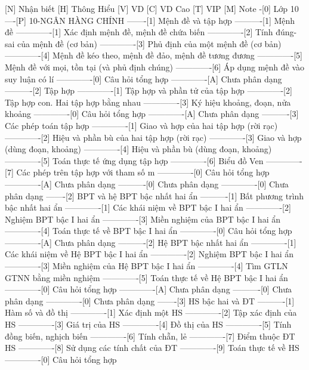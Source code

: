 [N] Nhận biết
[H] Thông Hiểu
[V] VD
[C] VD Cao
[T] VIP
[M] Note
%
%
-[0] Lớp 10
----[P] 10-NGÂN HÀNG CHÍNH
-------[1] Mệnh đề và tập hợp
----------[1] Mệnh đề
-------------[1] Xác định mệnh đề, mệnh đề chứa biến
-------------[2] Tính đúng-sai của mệnh đề (cơ bản)
-------------[3] Phủ định của một mệnh đề (cơ bản)
-------------[4] Mệnh đề kéo theo, mệnh đề đảo, mệnh đề tương đương
-------------[5] Mệnh đề với mọi, tồn tại (và phủ định chúng)
-------------[6] Áp dụng mệnh đề vào suy luận có lí
-------------[0] Câu hỏi tổng hợp
-------------[A] Chưa phân dạng
----------[2] Tập hợp
-------------[1] Tập hợp và phần tử của tập hợp
-------------[2] Tập hợp con. Hai tập hợp bằng nhau
-------------[3] Ký hiệu khoảng, đoạn, nửa khoảng
-------------[0] Câu hỏi tổng hợp
-------------[A] Chưa phân dạng
----------[3] Các phép toán tập hợp
-------------[1] Giao và hợp của hai tập hợp (rời rạc)
-------------[2] Hiệu và phần bù của hai tập hợp (rời rạc)
-------------[3] Giao và hợp (dùng đoạn, khoảng)
-------------[4] Hiệu và phần bù (dùng đoạn, khoảng)
-------------[5] Toán thực tế ứng dụng tập hợp
-------------[6] Biểu đồ Ven
-------------[7] Các phép trên tập hợp với tham số m
-------------[0] Câu hỏi tổng hợp
-------------[A] Chưa phân dạng
----------[0] Chưa phân dạng
-------------[0] Chưa phân dạng
-------[2] BPT và hệ BPT bậc nhất hai ẩn
----------[1] Bất phương trình bậc nhất hai ẩn
-------------[1] Các khái niệm về BPT bậc I hai ẩn
-------------[2] Nghiệm BPT bậc I hai ẩn
-------------[3] Miền nghiệm của BPT bậc I hai ẩn
-------------[4] Toán thực tế về BPT bậc I hai ẩn
-------------[0] Câu hỏi tổng hợp
-------------[A] Chưa phân dạng
----------[2] Hệ BPT bậc nhất hai ẩn
-------------[1] Các khái niệm về Hệ BPT bậc I hai ẩn
-------------[2] Nghiệm BPT bậc I hai ẩn
-------------[3] Miền nghiệm của Hệ BPT bậc I hai ẩn
-------------[4] Tìm GTLN GTNN bằng miền nghiệm
-------------[5] Toán thực tế về Hệ BPT bậc I hai ẩn
-------------[0] Câu hỏi tổng hợp
-------------[A] Chưa phân dạng
----------[0] Chưa phân dạng
-------------[0] Chưa phân dạng
-------[3] HS bậc hai và ĐT
----------[1] Hàm số và đồ thị
-------------[1] Xác định một HS
-------------[2] Tập xác định của HS
-------------[3] Giá trị của HS
-------------[4] Đồ thị của HS
-------------[5] Tính đồng biến, nghịch biến
-------------[6] Tính chẵn, lẻ
-------------[7] Điểm thuộc ĐT HS
-------------[8] Sử dụng các tính chất của ĐT
-------------[9] Toán thực tế về HS
-------------[0] Câu hỏi tổng hợp

